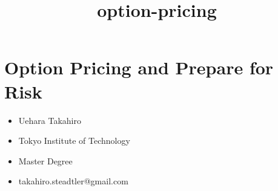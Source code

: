 \documentclass[11pt]{article}
\title{option-pricing}
\providecommand{\tightlist}{%
      \setlength{\itemsep}{0pt}\setlength{\parskip}{0pt}}
\begin{document}
    
    \maketitle
    
    

    
    \hypertarget{option-pricing-and-prepare-for-risk}{%
\section{Option Pricing and Prepare for
Risk}\label{option-pricing-and-prepare-for-risk}}

\begin{itemize}
\tightlist
\item
  Uehara Takahiro
\item
  Tokyo Institute of Technology\\
\item
  Master Degree\\
\item
  takahiro.steadtler@gmail.com
\end{itemize}
\end{document}
